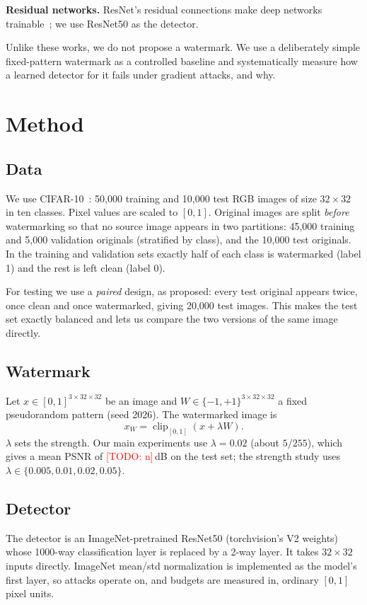 \documentclass[sigconf, nonacm]{acmart}
\newcommand{\todo}[1]{\textcolor{red}{[TODO: #1]}}
\providecommand{\BasePSNR}{\todo{n}}\providecommand{\RunDevice}{\todo{GPU}}
\begin{document}
\textbf{Residual networks.} ResNet's residual connections make deep networks trainable~\cite{paper1};
we use ResNet50 as the detector.

Unlike these works, we do not propose a watermark. We use a deliberately simple fixed-pattern
watermark as a controlled baseline and systematically measure how a learned detector for it
fails under gradient attacks, and why.

\section{Method}
\subsection{Data}
We use CIFAR-10~\cite{cifar10}: 50{,}000 training and 10{,}000 test RGB images of size
$32\times32$ in ten classes. Pixel values are scaled to $[0,1]$. Original images are split
\emph{before} watermarking so that no source image appears in two partitions: 45{,}000 training
and 5{,}000 validation originals (stratified by class), and the 10{,}000 test originals. In the
training and validation sets exactly half of each class is watermarked (label 1) and the rest is
left clean (label 0).

For testing we use a \emph{paired} design, as proposed: every test original appears twice, once
clean and once watermarked, giving 20{,}000 test images. This makes the test set exactly
balanced and lets us compare the two versions of the same image directly.

\subsection{Watermark}
Let $x \in [0,1]^{3\times32\times32}$ be an image and $W \in \{-1,+1\}^{3\times32\times32}$ a fixed
pseudorandom pattern (seed 2026). The watermarked image is
\[ x_W = \operatorname{clip}_{[0,1]}(x + \lambda W). \]
$\lambda$ sets the strength. Our main experiments use $\lambda = 0.02$ (about $5/255$), which
gives a mean PSNR of \BasePSNR\,dB on the test set; the strength study uses
$\lambda \in \{0.005, 0.01, 0.02, 0.05\}$.

\subsection{Detector}
The detector is an ImageNet-pretrained ResNet50 (torchvision's V2 weights) whose
1000-way classification layer is replaced by a 2-way layer. It takes $32\times32$ inputs
directly. ImageNet mean/std normalization is implemented as the model's first layer, so attacks
operate on, and budgets are measured in, ordinary $[0,1]$ pixel units.
\end{document}
